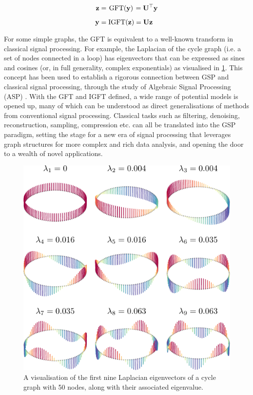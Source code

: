 \begin{align}
    \mathbf{z} &= \mkern 2mu \text{GFT}(\mathbf{y}) \mkern 2mu = \mathbf{U}^\top \mathbf{y} \\[0.2cm]
    \mathbf{y} &= \text{IGFT}(\mathbf{z})  = \mathbf{U} \mathbf{z}
\end{align}

For some simple graphs, the GFT is equivalent to a well-known transform in classical signal processing. For example, the Laplacian of the cycle graph (i.e. a set of nodes connected in a loop) has eigenvectors that can be expressed as sines and cosines (or, in full generality, complex exponentials) as visualised in \cref{fig:cycle_eighs}. This concept has been used to establish a rigorous connection between GSP and classical signal processing, through the study of Algebraic Signal Processing (ASP) \citep{Puschel2003, Sandryhaila2013}. With the GFT and IGFT defined, a wide range of potential models is opened up, many of which can be understood as direct generalisations of methods from conventional signal processing. Classical tasks such as filtering, denoising, reconstruction, sampling, compression etc. can all be translated into the GSP paradigm, setting the stage for a new era of signal processing that leverages graph structures for more complex and rich data analysis, and opening the door to a wealth of novel applications.

\begin{figure}[t]
	\centering
		\includegraphics[width=0.65\linewidth]{Figures/loop_plot.pdf}
        \caption[A visualisation of the Laplacian eigenvectors of the cycle graph]{A visualisation of the first nine Laplacian eigenvectors of a cycle graph with 50 nodes, along with their associated eigenvalue.}
	\label{fig:cycle_eighs}
\end{figure}


